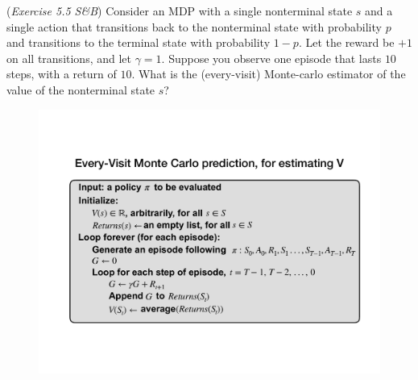  (\textit{Exercise 5.5 S\&B}) Consider an MDP with a single nonterminal state $s$ and a single action
that transitions back to the nonterminal state with probability $p$ and transitions to the
terminal state with probability $1-p$. Let the reward be $+1$ on all transitions, and let
 $\gamma = 1$. Suppose you observe one episode that lasts $10$ steps, with a return of $10$. What
is the (every-visit) Monte-carlo estimator of the value of the nonterminal state $s$?
%
\begin{figure}[h!]
  \center
\includegraphics[width=0.5\linewidth]{figures/c2_mc_everyvisit.pdf}
\end{figure}